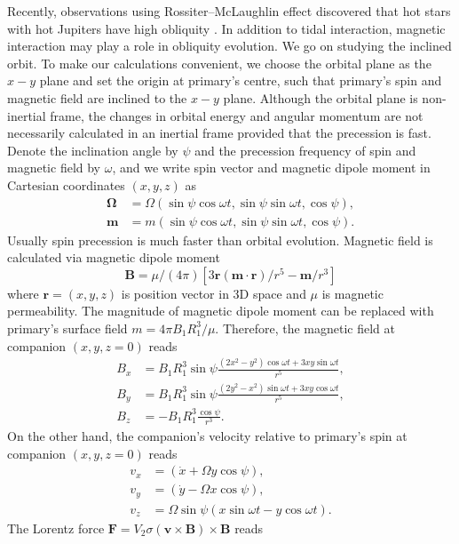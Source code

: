 \documentclass[twocolumn,linenumbers]{aastex631}
\begin{document}
Recently, observations using Rossiter–McLaughlin effect discovered that hot stars with hot Jupiters have high obliquity \citep{winn2010}. In addition to tidal interaction, magnetic interaction may play a role in obliquity evolution. We go on studying the inclined orbit. To make our calculations convenient, we choose the orbital plane as the $x-y$ plane and set the origin at primary's centre, such that primary's spin and magnetic field are inclined to the $x-y$ plane. Although the orbital plane is non-inertial frame, the changes in orbital energy and angular momentum are not necessarily calculated in an inertial frame provided that the precession is fast. Denote the inclination angle by $\psi$ and the precession frequency of spin and magnetic field by $\omega$, and we write spin vector and magnetic dipole moment in Cartesian coordinates $(x,y,z)$ as
\begin{align}\label{Omega-m}
\bm\Omega & =\Omega(\sin\psi\cos\omega t,\sin\psi\sin\omega t,\cos\psi),  \\
\bm m & =m(\sin\psi\cos\omega t,\sin\psi\sin\omega t,\cos\psi).
\end{align}
Usually spin precession is much faster than orbital evolution. Magnetic field is calculated via magnetic dipole moment
\begin{equation}
\bm B=\mu/(4\pi)\left[3\bm r(\bm m\cdot\bm r)/r^5-\bm m/r^3\right]
\end{equation}
where $\bm r=(x,y,z)$ is position vector in 3D space and $\mu$ is magnetic permeability. The magnitude of magnetic dipole moment can be replaced with primary's surface field $m=4\pi B_1R_1^3/\mu$. Therefore, the magnetic field at companion $(x,y,z=0)$ reads
\begin{align}
B_x & =B_1R_1^3\sin\psi\frac{(2x^2-y^2)\cos\omega t+3xy\sin\omega t}{r^5}, \label{B3d1} \\
B_y & =B_1R_1^3\sin\psi\frac{(2y^2-x^2)\sin\omega t+3xy\cos\omega t}{r^5}, \label{B3d2} \\
B_z & =-B_1R_1^3\frac{\cos\psi}{r^3}. \label{B3d3}
\end{align}
On the other hand, the companion's velocity relative to primary's spin at companion $(x,y,z=0)$ reads
\begin{align}
v_x & =(\dot x+\Omega y\cos\psi), \label{v3d1} \\
v_y & =(\dot y-\Omega x\cos\psi), \label{v3d2} \\
v_z & =\Omega\sin\psi(x\sin\omega t-y\cos\omega t). \label{v3d3}
\end{align}
The Lorentz force $\bm F=V_2\sigma(\bm v\times\bm B)\times\bm B$ reads
\end{document}
